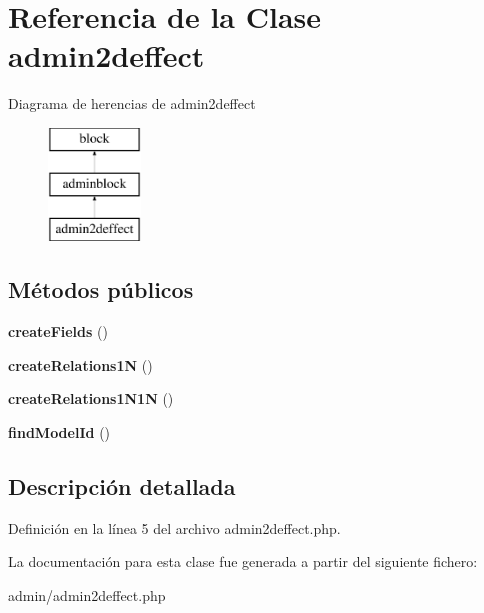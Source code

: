 \hypertarget{classadmin2deffect}{\section{\-Referencia de la \-Clase admin2deffect}
\label{classadmin2deffect}
}
\-Diagrama de herencias de admin2deffect\begin{figure}[H]
\begin{center}
\leavevmode
\includegraphics[height=3.000000cm]{classadmin2deffect}
\end{center}
\end{figure}
\subsection*{\-Métodos públicos}
\begin{DoxyCompactItemize}
\item 
\hypertarget{classadmin2deffect_a53778a0feb5e76953729f6d462a60a6d}{{\bfseries create\-Fields} ()}\label{classadmin2deffect_a53778a0feb5e76953729f6d462a60a6d}

\item 
\hypertarget{classadmin2deffect_ad419ce3181b153ff1ca5a3e9489d0d0c}{{\bfseries create\-Relations1\-N} ()}\label{classadmin2deffect_ad419ce3181b153ff1ca5a3e9489d0d0c}

\item 
\hypertarget{classadmin2deffect_a248fde2f295d2f474d17cdb8687db3e9}{{\bfseries create\-Relations1\-N1\-N} ()}\label{classadmin2deffect_a248fde2f295d2f474d17cdb8687db3e9}

\item 
\hypertarget{classadmin2deffect_aa7719143b1c8117347888897aa8e91de}{{\bfseries find\-Model\-Id} ()}\label{classadmin2deffect_aa7719143b1c8117347888897aa8e91de}

\end{DoxyCompactItemize}


\subsection{\-Descripción detallada}


\-Definición en la línea 5 del archivo admin2deffect.\-php.



\-La documentación para esta clase fue generada a partir del siguiente fichero\-:\begin{DoxyCompactItemize}
\item 
admin/admin2deffect.\-php\end{DoxyCompactItemize}
